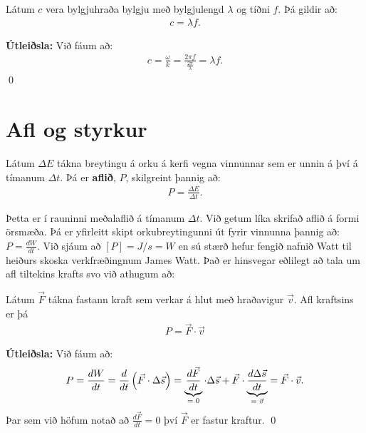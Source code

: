 \begin{tcolorbox}
\begin{theorem}
Látum $c$ vera bylgjuhraða bylgju með bylgjulengd $\lambda$ og tíðni $f$. Þá gildir að:
\begin{align*}
    c = \lambda f.
\end{align*}
\end{theorem}
\end{tcolorbox}

\textbf{Útleiðsla:} Við fáum að:
\begin{align*}
    c = \frac{\omega}{k} = \frac{2\pi f}{\frac{2\pi}{\lambda}} = \lambda f.
\end{align*}
\qed

\section{Afl og styrkur}

\begin{tcolorbox}
\begin{definition}
Látum $\Delta E$ tákna breytingu á orku á kerfi vegna vinnunnar sem er unnin á því á tímanum $\Delta t$. Þá er \textbf{aflið}, $P$, skilgreint þannig að:
\begin{align*}
    P = \frac{\Delta E}{\Delta t}.
\end{align*}
\end{definition}
\end{tcolorbox}

Þetta er í rauninni meðalaflið á tímanum $\Delta t$. Við getum líka skrifað aflið á formi örsmæða. Þá er yfirleitt skipt orkubreytingunni út fyrir vinnunna þannig að: $P = \frac{d W}{dt}$. Við sjáum að $[P] = \si{J/s} = \si{W}$ en sú stærð hefur fengið nafnið Watt til heiðurs skoska verkfræðingnum James Watt. Það er hinsvegar eðlilegt að tala um afl tiltekins krafts svo við athugum að:

\begin{tcolorbox}
\begin{theorem}
Látum $\vec{F}$ tákna fastann kraft sem verkar á hlut með hraðavigur $\vec{v}$. Afl kraftsins er þá
\begin{align*}
    P = \Vec{F} \cdot \Vec{v}
\end{align*}
\end{theorem}
\end{tcolorbox}

\textbf{Útleiðsla:} Við fáum að:
\begin{align*}
    P = \frac{dW}{dt} = \frac{d}{dt}\left( \Vec{F} \cdot \Delta \Vec{s} \right) = \underbrace{\frac{d\Vec{F}}{dt}}_\textrm{$=0$} \cdot \Delta \Vec{s} + \Vec{F} \cdot \underbrace{\frac{d\Delta \Vec{s}}{dt}}_\textrm{$= \vec{v}$} = \Vec{F} \cdot \Vec{v}.
\end{align*}
Þar sem við höfum notað að $\frac{d \Vec{F}}{dt} = 0$ því $\Vec{F}$ er fastur kraftur.
\qed


